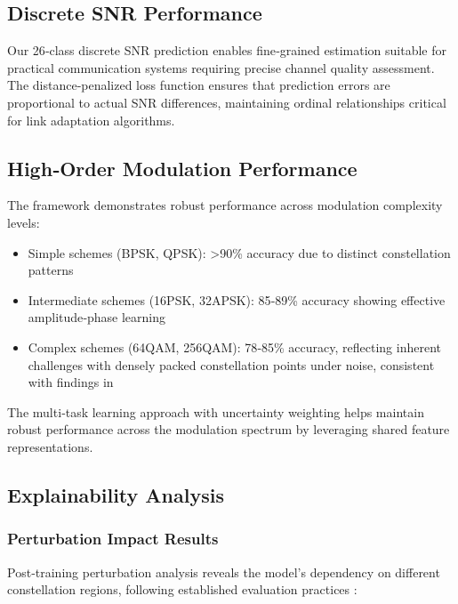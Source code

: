 \documentclass{ELSP}
\begin{document}
\subsection{Discrete SNR Performance}

Our 26‑class discrete SNR prediction enables fine‑grained estimation suitable for practical communication systems requiring precise channel quality assessment. The distance‑penalized loss function ensures that prediction errors are proportional to actual SNR differences, maintaining ordinal relationships critical for link adaptation algorithms.

\subsection{High‑Order Modulation Performance}

The framework demonstrates robust performance across modulation complexity levels:
\begin{itemize}
\item Simple schemes (BPSK, QPSK): >90\% accuracy due to distinct constellation patterns
\item Intermediate schemes (16PSK, 32APSK): 85‑89\% accuracy showing effective amplitude‑phase learning
\item Complex schemes (64QAM, 256QAM): 78‑85\% accuracy, reflecting inherent challenges with densely packed constellation points under noise, consistent with findings in \cite{zheng2023toward}
\end{itemize}

The multi‑task learning approach with uncertainty weighting helps maintain robust performance across the modulation spectrum by leveraging shared feature representations.

\subsection{Explainability Analysis}

\subsubsection{Perturbation Impact Results}

Post‑training perturbation analysis reveals the model's dependency on different constellation regions, following established evaluation practices \cite{fel2023don,dineen2024unified}:
\end{document}
